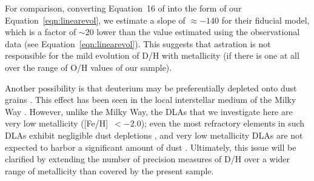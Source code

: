 \documentclass[12pt,preprint,useAMS,usenatbib]{emulateapj}
\begin{document}
For comparison, converting Equation~16 of \citet{Wei16} into the
form of our Equation~\ref{eqn:linearevol}, we estimate a slope of
$\approx-140$ for their fiducial model, which is a factor of $\sim20$
lower than the value estimated using the observational data
(see Equation~\ref{eqn:linearevol}). This suggests that astration
is not responsible for the mild evolution of D/H with metallicity
(if there is one at all over the range of O/H values of our sample).

Another possibility is that deuterium may be preferentially
depleted onto dust grains \citep{Jur82,Dra04,Dra06}. This
effect has been seen in the local interstellar medium of the
Milky Way \citep{Woo04,ProTriHow05,Lin06,EliProLop07,LalHebWal08,ProSteFie10}.
However, unlike the Milky Way, the DLAs that we investigate
here are very low metallicity ([Fe/H]~$<-2.0$); even the most
refractory elements in such DLAs exhibit negligible dust
depletions \citep{Pet97,Vla04,Ake05}, and very low
metallicity DLAs are not expected
to harbor a significant amount of dust
\citep[see][and references therein]{MurBer16}.
Ultimately, this issue will be clarified by extending the
number of precision measures of D/H over a wider
range of metallicity than covered by the present sample.
\end{document}
